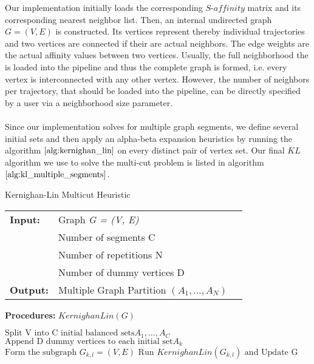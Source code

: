 Our implementation initially loads the corresponding $\textit{S-affinity}$ matrix and its corresponding nearest neighbor list. Then, an internal undirected graph $G = \left( V, E \right)$ is constructed. Its vertices represent thereby individual trajectories and two vertices are connected if their are actual neighbors. The edge weights are the actual affinity values between two vertices. Usually, the full neighborhood the is loaded into the pipeline and thus the complete graph is formed, i.e. every vertex is interconnected with any other vertex. However, the number of neighbors per trajectory, that should be loaded into the pipeline, can be directly specified by a user via a neighborhood size parameter. \\ \\
Since our implementation solves for multiple graph segments, we define several initial sets and then apply an alpha-beta expansion heuristics by running the algorithm $\ref{alg:kernighan_lin}$ on every distinct pair of vertex set. Our final $KL$ algorithm we use to solve the multi-cut problem is listed in algorithm $\ref{alg:kl_multiple_segments}$.
\begin{algorithm}[H]
\caption{Kernighan-Lin Multicut Heuristic}
\begin{table}[H]
  \begin{tabular}{@{}lll@{}}
    \textbf{Input:} & Graph \emph{G = (V, E)} \\
        & Number of segments C \\
    & Number of repetitions N  \\
    & Number of dummy vertices D \\
	\textbf{Output:} & Multiple Graph Partition $\left( A_1,\dots, A_N \right)$ 
  \end{tabular} 
\end{table}
\textbf{Procedures:} $KernighanLin(G)$  \\
\setlength{\fboxrule}{0pt} 
\begin{boxedminipage}{1.0\textwidth}
  \begin{algorithmic}[1]
  	  \State $\text{Split V into C initial balanced sets} A_1,\dots,A_C$
  	  \State $\text{Append D dummy vertices to each initial set} A_k$ 
        \State $ \text{Form the subgraph } G_{k,l} = (V, E)$
		\State $\text{Run } KernighanLin(G_{k,l}) \text{ and Update G}$
      \EndFor
  \end{algorithmic}
  \end{boxedminipage}
  \vskip1.5pt
\label{alg:kl_multiple_segments}
\end{algorithm}  
  
